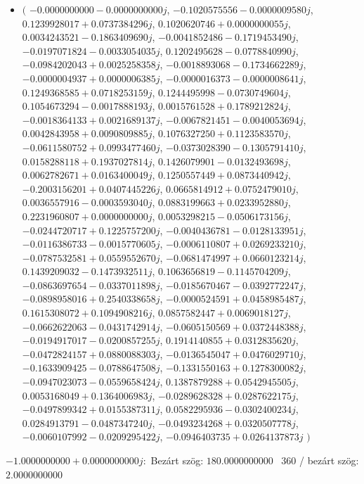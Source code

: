 \documentclass[14pt,a4paper]{article}
\begin{document}
\begin{itemize}
\item
$\big($
$-0.0000000000-0.0000000000j$, $-0.1020575556-0.0000009580j$, $0.1239928017+0.0737384296j$, $0.1020620746+0.0000000055j$, $0.0034243521-0.1863409690j$, $-0.0041852486-0.1719453490j$, $-0.0197071824-0.0033054035j$, $0.1202495628-0.0778840990j$, $-0.0984202043+0.0025258358j$, $-0.0018893068-0.1734662289j$, $-0.0000004937+0.0000006385j$, $-0.0000016373-0.0000008641j$, $0.1249368585+0.0718253159j$, $0.1244495998-0.0730749604j$, $0.1054673294-0.0017888193j$, $0.0015761528+0.1789212824j$, $-0.0018364133+0.0021689137j$, $-0.0067821451-0.0040053694j$, $0.0042843958+0.0090809885j$, $0.1076327250+0.1123583570j$, $-0.0611580752+0.0993477460j$, $-0.0373028390-0.1305791410j$, $0.0158288118+0.1937027814j$, $0.1426079901-0.0132493698j$, $0.0062782671+0.0163400049j$, $0.1250557449+0.0873440942j$, $-0.2003156201+0.0407445226j$, $0.0665814912+0.0752479010j$, $0.0036557916-0.0003593040j$, $0.0883199663+0.0233952880j$, $0.2231960807+0.0000000000j$, $0.0053298215-0.0506173156j$, $-0.0244720717+0.1225757200j$, $-0.0040436781-0.0128133951j$, $-0.0116386733-0.0015770605j$, $-0.0006110807+0.0269233210j$, $-0.0787532581+0.0559552670j$, $-0.0681474997+0.0660123214j$, $0.1439209032-0.1473932511j$, $0.1063656819-0.1145704209j$, $-0.0863697654-0.0337011898j$, $-0.0185670467-0.0392772247j$, $-0.0898958016+0.2540338658j$, $-0.0000524591+0.0458985487j$, $0.1615308072+0.1094908216j$, $0.0857582447+0.0069018127j$, $-0.0662622063-0.0431742914j$, $-0.0605150569+0.0372448388j$, $-0.0194917017-0.0200857255j$, $0.1914140855+0.0312835620j$, $-0.0472824157+0.0880088303j$, $-0.0136545047+0.0476029710j$, $-0.1633909425-0.0788647508j$, $-0.1331550163+0.1278300082j$, $-0.0947023073-0.0559658424j$, $0.1387879288+0.0542945505j$, $0.0053168049+0.1364006983j$, $-0.0289628328+0.0287622175j$, $-0.0497899342+0.0155387311j$, $0.0582295936-0.0302400234j$, $0.0284913791-0.0487347240j$, $-0.0493234268+0.0320507778j$, $-0.0060107992-0.0209295422j$, $-0.0946403735+0.0264137873j$
$\big)$
\end{itemize}
$-1.0000000000+0.0000000000j$:\
Bezárt szög: $180.0000000000$ \
360 / bezárt szög: $2.0000000000$\
\end{document}
